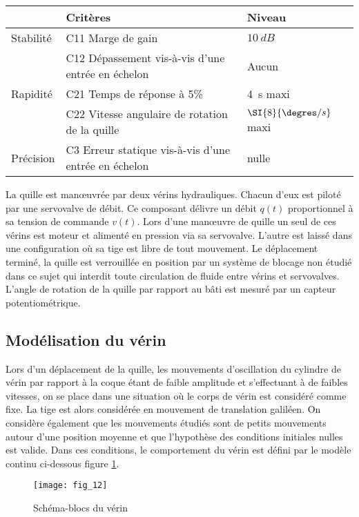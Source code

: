 \begin{center}
\begin{tabular}{lll}
\cline{2-3}
& Critères & Niveau \\
\hline
Stabilité	 & 	C11 Marge de gain 		& $\SI{10}{dB}$ \\
	 &	C12 Dépassement vis-à-vis d’une entrée en échelon 	& Aucun \\
\hline 		
Rapidité &	C21 Temps de réponse à 5\% 	& \SI{4}{s} maxi	\\
	&	C22 Vitesse angulaire de rotation de la quille	& $\SI{8}{\degres/s}$ maxi \\
\hline
Précision &	C3 Erreur statique vis-à-vis d’une entrée en échelon	& nulle \\
\hline
\end{tabular}
\end{center}

La quille est manœuvrée par deux vérins hydrauliques. Chacun d’eux est piloté par une servovalve de débit. Ce composant délivre un débit $q(t)$ proportionnel à sa tension de commande $v(t)$. Lors d’une manœuvre de quille un seul de ces vérins est moteur et alimenté en pression via sa servovalve. L’autre est laissé dans une configuration où sa tige est libre de tout mouvement. Le déplacement terminé, la quille est verrouillée en position par un système de blocage non étudié dans ce sujet qui interdit toute circulation de fluide entre vérins et servovalves. L’angle de rotation de la quille par rapport au bâti est mesuré par un capteur potentiométrique.
\fi

\subsection{Modélisation du vérin}


\ifprof
\else
Lors d’un déplacement de la quille, les mouvements d’oscillation du cylindre de vérin par rapport à la coque étant de faible amplitude et s’effectuant à de faibles vitesses, on se place dans une situation où le corps de vérin est considéré comme fixe. La tige est alors considérée en mouvement de translation galiléen.
On considère également que les mouvements étudiés sont de petits mouvements autour d’une position moyenne et que l’hypothèse des conditions initiales nulles est valide. Dans ces conditions, le comportement du vérin est défini par le modèle continu ci-dessous  figure \ref{fig_12_quille}.

\begin{figure}
\centering
\texttt{[image: fig\_12]}
\caption{Schéma-blocs du vérin \label{fig_12_quille}}
\end{figure}


